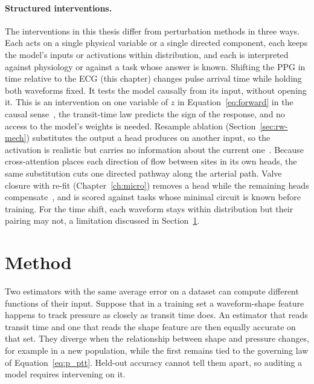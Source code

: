 \paragraph{Structured interventions.}
The interventions in this thesis differ from perturbation methods in three ways. Each acts on a single physical variable or a single directed component, each keeps the model's inputs or activations within distribution, and each is interpreted against physiology or against a task whose answer is known. Shifting the PPG in time relative to the ECG (this chapter) changes pulse arrival time while holding both waveforms fixed. It tests the model causally from its input, without opening it. This is an intervention on one variable of $z$ in Equation~\eqref{eq:forward} in the causal sense~\cite{janzing2020feature,geiger2021causal,geiger2025causal}, the transit-time law predicts the sign of the response, and no access to the model's weights is needed. Resample ablation (Section~\ref{sec:rw-mech}) substitutes the output a head produces on another input, so the activation is realistic but carries no information about the current one~\cite{chan2022causal}. Because cross-attention places each direction of flow between sites in its own heads, the same substitution cuts one directed pathway along the arterial path. Valve closure with re-fit (Chapter~\ref{ch:micro}) removes a head while the remaining heads compensate~\citep{obs}, and is scored against tasks whose minimal circuit is known before training. For the time shift, each waveform stays within distribution but their pairing may not, a limitation discussed in Section~\ref{sec:audit}.



\section{Method}
\label{sec:audit}

Two estimators with the same average error on a dataset can compute different functions of their input. Suppose that in a training set a waveform-shape feature happens to track pressure as closely as transit time does. An estimator that reads transit time and one that reads the shape feature are then equally accurate on that set. They diverge when the relationship between shape and pressure changes, for example in a new population, while the first remains tied to the governing law of Equation~\eqref{eq:p_ptt}. Held-out accuracy cannot tell them apart, so auditing a model requires intervening on it.

